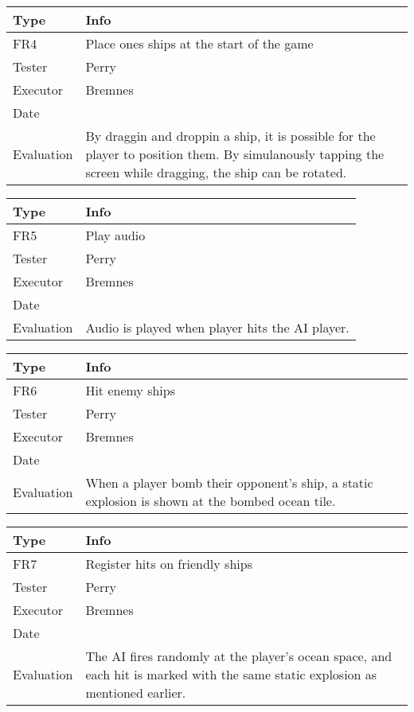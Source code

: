 \vspace{0.5em}

\noindent
\begin{tabular}{|p{2cm}|p{9.5cm}|}
	\hline
	\bf{Type}	& \bf{Info} \\
	\hline
	FR4			& Place ones ships at the start of the game \\
	Tester		& Perry \\
	Executor	& Bremnes \\
	Date		& \date{\today} \\
	Evaluation	& By draggin and droppin a ship, it is possible for the player to position them. By simulanously tapping the screen while dragging, the ship can be rotated. \\
	\hline
\end{tabular}

\vspace{0.5em}

\noindent
\begin{tabular}{|p{2cm}|p{9.5cm}|}
	\hline
	\bf{Type}	& \bf{Info} \\
	\hline
	FR5			& Play audio \\
	Tester		& Perry \\
	Executor	& Bremnes \\
	Date		& \date{\today} \\
	Evaluation	& Audio is played when player hits the AI player. \\
	\hline
\end{tabular}

\vspace{0.5em}

\noindent
\begin{tabular}{|p{2cm}|p{9.5cm}|}
	\hline
	\bf{Type}	& \bf{Info} \\
	\hline
	FR6			& Hit enemy ships \\
	Tester		& Perry \\
	Executor	& Bremnes \\
	Date		& \date{\today} \\
	Evaluation	& When a player bomb their opponent's ship, a static explosion is shown at the bombed ocean tile. \\
	\hline
\end{tabular}

\vspace{0.5em}

\noindent
\begin{tabular}{|p{2cm}|p{9.5cm}|}
	\hline
	\bf{Type}	& \bf{Info} \\
	\hline
	FR7			& Register hits on friendly ships \\
	Tester		& Perry \\
	Executor	& Bremnes \\
	Date		& \date{\today} \\
	Evaluation	& The AI fires randomly at the player's ocean space, and each hit is marked with the same static explosion as mentioned earlier. \\
	\hline
\end{tabular}

